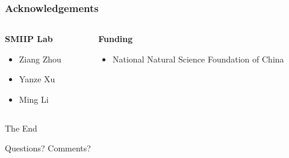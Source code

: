 \documentclass[
	11pt, %
]{beamer}
\begin{document}
\begin{frame}
	\frametitle{Acknowledgements}
	
	\begin{columns}[t] %
		\begin{column}{0.45\textwidth} %
			\textbf{SMIIP Lab}
			\begin{itemize}
				\item Ziang Zhou
				\item Yanze Xu
				\item Ming Li
			\end{itemize}
		\end{column}		
		\begin{column}{0.5\textwidth} %
			\textbf{Funding}
			\begin{itemize}
				\item National Natural Science Foundation of China
			\end{itemize}
		\end{column}
	\end{columns}
\end{frame}


\begin{frame}[plain] %
	\begin{center}
		{\Huge The End}
		
		\bigskip\bigskip %
		
		{\LARGE Questions? Comments?}
	\end{center}
\end{frame}

\end{document}
